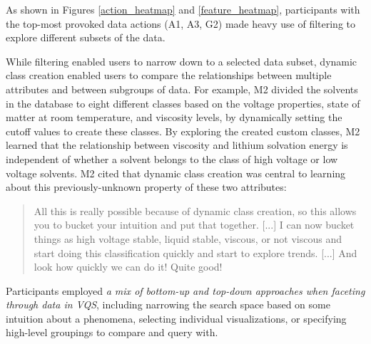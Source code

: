 As shown in Figures \ref{action_heatmap} and \ref{feature_heatmap}, participants with the top-most provoked data actions (A1, A3, G2) made heavy use of filtering to explore different subsets of the data. 
\par While filtering enabled users to narrow down to a selected data subset, dynamic class creation enabled users to compare the relationships between multiple attributes and between subgroups of data. For example, M2 divided the solvents in the database to eight different classes based on the voltage properties, state of matter at room temperature, and viscosity levels, by dynamically setting the cutoff values to create these classes. By exploring the created custom classes, M2 learned that the relationship between viscosity and lithium solvation energy is independent of whether a solvent belongs to the class of high voltage or low voltage solvents. M2 cited that dynamic class creation was central to learning about this previously-unknown property of these two attributes: 
\begin{quote}
All this is really possible because of dynamic class creation, so this allows you to bucket your intuition and put that together. [...] I can now bucket things as high voltage stable, liquid stable, viscous, or not viscous and start doing this classification quickly and start to explore trends. [...] And look how quickly we can do it! Quite good!
\end{quote}
\par Participants employed \emph{a mix of bottom-up and top-down approaches when faceting through data in VQS}, including narrowing the search space based on some intuition about a phenomena, selecting individual visualizations, or specifying high-level groupings to compare and query with.
